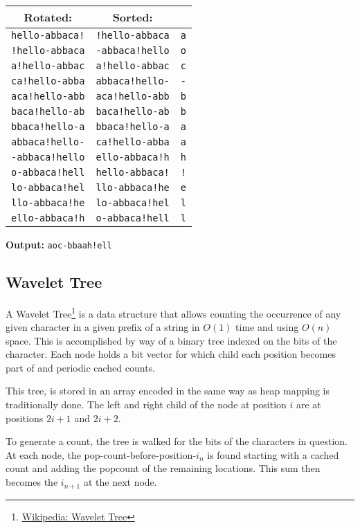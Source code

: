 \documentclass[12pt]{article}
\begin{document}
\vspace{0.75em}
\noindent\begin{tabular}{ c|c|c }
  Rotated: & Sorted: \\ 
  \hline
  {\tt hello-abbaca!} & {\tt !hello-abbaca} & {\tt a} \\
  {\tt !hello-abbaca} & {\tt -abbaca!hello} & {\tt o} \\
  {\tt a!hello-abbac} & {\tt a!hello-abbac} & {\tt c} \\
  {\tt ca!hello-abba} & {\tt abbaca!hello-} & {\tt -} \\
  {\tt aca!hello-abb} & {\tt aca!hello-abb} & {\tt b} \\
  {\tt baca!hello-ab} & {\tt baca!hello-ab} & {\tt b} \\
  {\tt bbaca!hello-a} & {\tt bbaca!hello-a} & {\tt a} \\
  {\tt abbaca!hello-} & {\tt ca!hello-abba} & {\tt a} \\
  {\tt -abbaca!hello} & {\tt ello-abbaca!h} & {\tt h} \\
  {\tt o-abbaca!hell} & {\tt hello-abbaca!} & {\tt !} \\
  {\tt lo-abbaca!hel} & {\tt llo-abbaca!he} & {\tt e} \\
  {\tt llo-abbaca!he} & {\tt lo-abbaca!hel} & {\tt l} \\
  {\tt ello-abbaca!h} & {\tt o-abbaca!hell} & {\tt l} \\
\end{tabular}

\vspace{0.75em}
\noindent\textbf{Output:} {\tt aoc-bbaah!ell}

\subsection{Wavelet Tree}
A Wavelet Tree\footnote{\href{https://en.wikipedia.org/wiki/Wavelet_Tree}{Wikipedia: Wavelet Tree}}
 is a data structure that allows counting the occurrence of any given character
 in a given prefix of a string in $O(1)$ time and using $O(n)$ space.
This is accomplished by way of a binary tree indexed on the bits of the character.
Each node holds a bit vector for which child each position becomes part of and
 periodic cached counts.

This tree, is stored in an array encoded in the same way as heap mapping is
 traditionally done.
The left and right child of the node at position $i$ are at positions $2i + 1$
 and $2i + 2$.

To generate a count, the tree is walked for the bits of the characters in question.
At each node, the pop-count-before-position-$i_n$ is found starting with a cached
 count and adding the popcount of the remaining locations.
This sum then becomes the $i_{n+1}$ at the next node.
\end{document}
